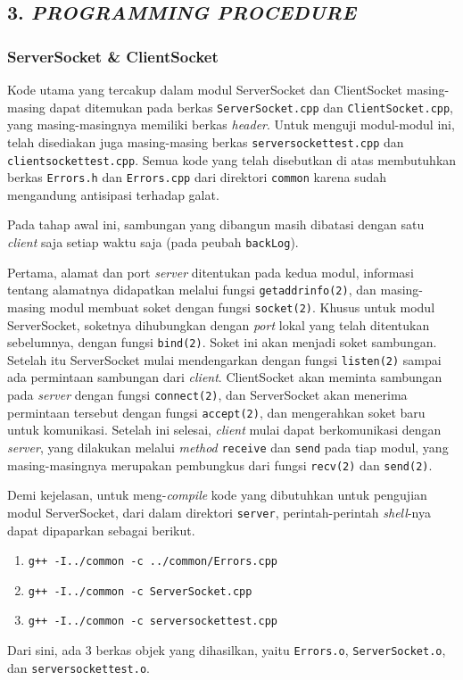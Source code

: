 \subsection*{\textcolor{subsectioncolor}{\textsf{3. \textit{PROGRAMMING PROCEDURE}}}}


\subsubsection*{ServerSocket  \& ClientSocket}

Kode utama yang tercakup dalam modul ServerSocket dan ClientSocket masing-masing dapat ditemukan pada berkas \texttt{ServerSocket.cpp} dan \texttt{ClientSocket.cpp},
yang masing-masingnya memiliki berkas \textit{header}.
Untuk menguji modul-modul ini, telah disediakan juga masing-masing berkas \texttt{serversockettest.cpp} dan \texttt{clientsockettest.cpp}.
Semua kode yang telah disebutkan di atas membutuhkan berkas \texttt{Errors.h} dan \texttt{Errors.cpp} dari direktori \texttt{common} karena sudah mengandung antisipasi terhadap galat.

Pada tahap awal ini,
sambungan yang dibangun masih dibatasi dengan satu \textit{client} saja setiap waktu saja (pada peubah \texttt{backLog}).

Pertama, alamat dan port \textit{server} ditentukan pada kedua modul,
informasi tentang alamatnya didapatkan melalui fungsi \texttt{getaddrinfo(2)},
dan masing-masing modul membuat soket dengan fungsi \texttt{socket(2)}.
Khusus untuk modul ServerSocket,
soketnya dihubungkan dengan \textit{port} lokal yang telah ditentukan sebelumnya,
dengan fungsi \texttt{bind(2)}.
Soket ini akan menjadi soket sambungan.
Setelah itu ServerSocket mulai mendengarkan dengan fungsi \texttt{listen(2)} sampai ada permintaan sambungan dari \textit{client}.
ClientSocket akan meminta sambungan pada \textit{server} dengan fungsi \texttt{connect(2)},
dan ServerSocket akan menerima permintaan tersebut dengan fungsi \texttt{accept(2)},
dan mengerahkan soket baru untuk komunikasi.
Setelah ini selesai, \textit{client} mulai dapat berkomunikasi dengan \textit{server},
yang dilakukan melalui \textit{method} \texttt{receive} dan \texttt{send} pada tiap modul,
yang masing-masingnya merupakan pembungkus dari fungsi \texttt{recv(2)} dan \texttt{send(2)}.

Demi kejelasan,
untuk meng-\textit{compile} kode yang dibutuhkan untuk pengujian modul ServerSocket,
dari dalam direktori \texttt{server},
perintah-perintah \textit{shell}-nya dapat dipaparkan sebagai berikut.
\begin{enumerate}
\item \verb!g++ -I../common -c ../common/Errors.cpp!
\item \verb!g++ -I../common -c ServerSocket.cpp!
\item \verb!g++ -I../common -c serversockettest.cpp!
\end{enumerate}
Dari sini, ada 3 berkas objek yang dihasilkan,
yaitu \texttt{Errors.o}, \texttt{ServerSocket.o}, dan \texttt{serversockettest.o}.

